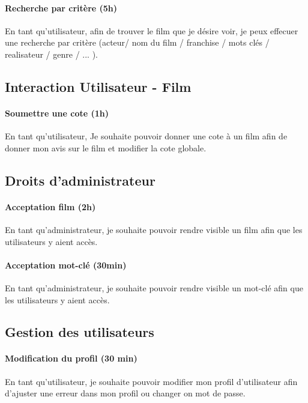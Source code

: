 \documentclass[a4paper,12pt]{article}
\begin{document}
\paragraph{Recherche par critère (5h)}
En tant qu'utilisateur, afin de trouver le film que je désire voir, je peux effecuer une recherche par critère (acteur/ nom du film / franchise / mots clés / realisateur / genre / ... ).

\subsection{Interaction Utilisateur - Film}

\paragraph{Soumettre une cote (1h)}
En tant qu'utilisateur, Je souhaite pouvoir donner une cote à un film afin de donner mon avis sur le film et modifier la cote globale.

\subsection{Droits d'administrateur}

\paragraph{Acceptation film (2h)}
En tant qu'administrateur, je souhaite pouvoir rendre visible un film afin que les utilisateurs y aient accès.

\paragraph{Acceptation mot-clé (30min)}
En tant qu'administrateur, je souhaite pouvoir rendre visible un mot-clé afin que les
utilisateurs y aient accès.

\subsection{Gestion des utilisateurs}

\paragraph{Modification du profil (30 min)}
En tant qu'utilisateur, je souhaite pouvoir modifier mon profil d'utilisateur afin d'ajuster une erreur dans mon profil ou changer on mot de passe.
\end{document}
